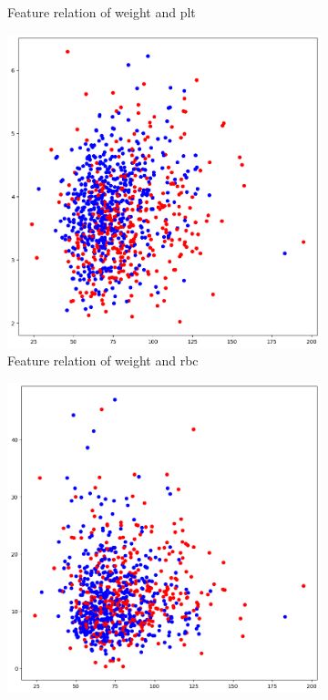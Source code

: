 \documentclass[../main.tex]{subfiles}
\begin{document}
\begin{figure}
\begin{subfigure}{0.45\textwidth}
        \caption{Feature relation of weight and plt}
        \label{fig:tabpfn-weight-plt}
    \end{subfigure}

    \vfill

    \begin{subfigure}{0.45\textwidth}
        \centering
        \includegraphics[width=\linewidth]{Figure/tabpfn-weight-rbc.png}
        \caption{Feature relation of weight and rbc}
        \label{fig:tabpfn-weight-rbc}
    \end{subfigure}
    \hfill
    \begin{subfigure}{0.45\textwidth}
        \centering
        \includegraphics[width=\linewidth]{Figure/tabpfn-weight-wbc.png}

\end{subfigure}
\end{figure}
\end{document}
